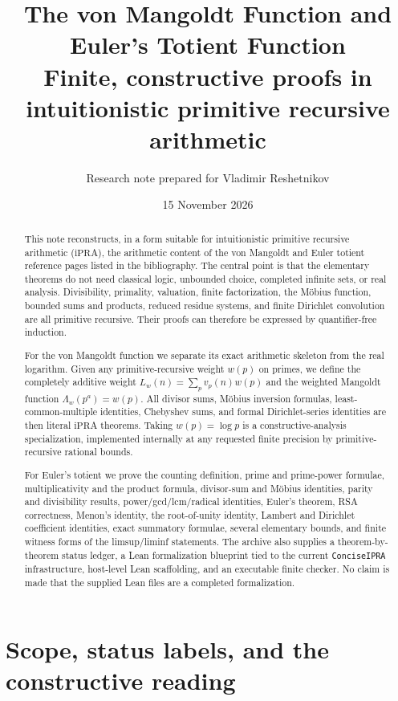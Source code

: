 \documentclass[11pt]{article}
\title{\textbf{The von Mangoldt Function and Euler's Totient Function}\\
\large Finite, constructive proofs in intuitionistic primitive recursive arithmetic}
\author{Research note prepared for Vladimir Reshetnikov}
\date{15 November 2026}
\theoremstyle{definition}
\newcommand{\ipra}{\mathrm{iPRA}}
\newcommand{\code}[1]{\nolinkurl{#1}}
\begin{document}
\maketitle

\begin{abstract}
This note reconstructs, in a form suitable for intuitionistic primitive
recursive arithmetic (\(\ipra\)), the arithmetic content of the von Mangoldt
and Euler totient reference pages listed in the bibliography.  The central
point is that the elementary theorems do not need classical logic, unbounded
choice, completed infinite sets, or real analysis.  Divisibility, primality,
valuation, finite factorization, the M\"obius function, bounded sums and
products, reduced residue systems, and finite Dirichlet convolution are all
primitive recursive.  Their proofs can therefore be expressed by
quantifier-free induction.

For the von Mangoldt function we separate its exact arithmetic skeleton from
the real logarithm.  Given any primitive-recursive weight \(w(p)\) on primes,
we define the completely additive weight
\(L_w(n)=\sum_p v_p(n)w(p)\) and the weighted Mangoldt function
\(\Lambda_w(p^a)=w(p)\).  All divisor sums, M\"obius inversion formulas,
least-common-multiple identities, Chebyshev sums, and formal Dirichlet-series
identities are then literal \(\ipra\) theorems.  Taking \(w(p)=\log p\) is a
constructive-analysis specialization, implemented internally at any requested
finite precision by primitive-recursive rational bounds.

For Euler's totient we prove the counting definition, prime and prime-power
formulae, multiplicativity and the product formula, divisor-sum and M\"obius
identities, parity and divisibility results, power/gcd/lcm/radical identities,
Euler's theorem, RSA correctness, Menon's identity, the root-of-unity identity,
Lambert and Dirichlet coefficient identities, exact summatory formulae,
several elementary bounds, and finite witness forms of the limsup/liminf
statements.  The archive also supplies a theorem-by-theorem status ledger, a
Lean formalization blueprint tied to the current \code{ConciseIPRA}
infrastructure, host-level Lean scaffolding, and an executable finite checker.
No claim is made that the supplied Lean files are a completed formalization.
\end{abstract}

\tableofcontents
\newpage

\section{Scope, status labels, and the constructive reading}
\end{document}
